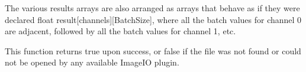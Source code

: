 The various results arrays are also arranged as arrays that behave as if
they were declared {\cf  float result[channels][BatchSize]}, where all the
batch values for channel 0 are adjacent, followed by all the batch values
for channel 1, etc.

This function returns {\cf true} upon success, or {\cf false} if the
file was not found or could not be opened by any available ImageIO
plugin.
\apiend

\begin{comment}
\apiitem{bool {\ce shadow} (ustring filename, TextureOptBatch \&options,\\
\bigspc                         Tex::RunMask mask, \\
\bigspc                         const float *P, const float *dPdx,\\
\bigspc                         const float *dPdy, int nchannels, float *result,\\
\bigspc                         float *dresultds=nullptr, float *dresultdt=nullptr)\\[2ex]
bool {\ce shadow} (TextureHandle *texture_handle,  Perthread *thread_info, \\
\bigspc                         TextureOptBatch \&options,\\
\bigspc                         Tex::RunMask mask, \\
\bigspc                         const float *P, const float *dPdx,\\
\bigspc                         const float *dPdy, int nchannels, float *result,\\
\bigspc                         float *dresultds=nullptr, float *dresultdt=nullptr)}

Perform filtered shadow map lookups on a batch of positions from
the same texture, all at once. The ``point-like'' parameters {\cf P},
{\cf dPdx}, and {\cf dPdy} are each a pointers to arrays of
{\cf float value[3][BatchSize]}. That is, each one points to all the $x$ values
for the batch, immediately followed by all the $y$ values, followed by the
$z$ values.

The various results arrays are also arranged as arrays that behave as if
they were declared {\cf  float result[channels][BatchSize]}, where all the
batch values for channel 0 are adjacent, followed by all the batch values
for channel 1, etc.

This function returns {\cf true} upon success, or {\cf false} if the
file was not found or could not be opened by any available ImageIO
plugin.
\apiend
\end{comment}

